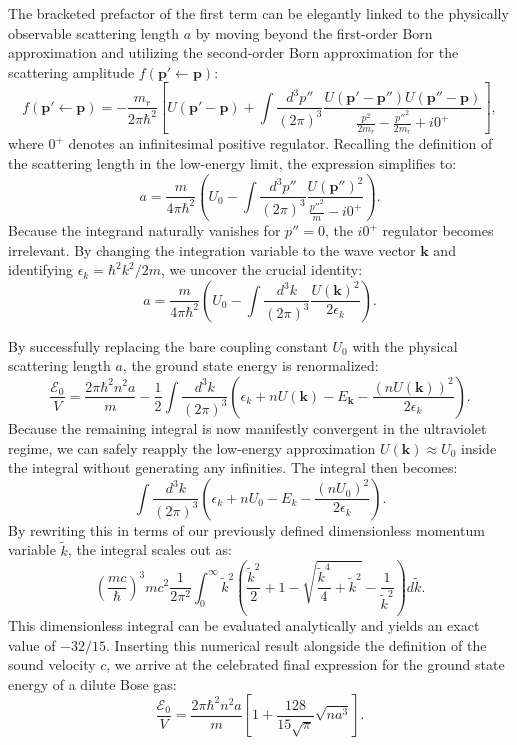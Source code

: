 The bracketed prefactor of the first term can be elegantly linked to the physically observable scattering length \( a \) by moving beyond the first-order Born approximation and utilizing the second-order Born approximation for the scattering amplitude \( f(\mathbf{p}' \leftarrow \mathbf{p}) \):
\[
    f(\mathbf{p}' \leftarrow \mathbf{p}) = -\frac{m_r}{2\pi\hbar^2} \left[ U(\mathbf{p}' - \mathbf{p}) + \int \frac{d^3p''}{(2\pi)^3} \frac{U(\mathbf{p}' - \mathbf{p}'')U(\mathbf{p}'' - \mathbf{p})}{\frac{p^2}{2m_r} - \frac{p''^2}{2m_r} + i0^+} \right],
\]
where \( 0^+ \) denotes an infinitesimal positive regulator. Recalling the definition of the scattering length in the low-energy limit, the expression simplifies to:
\[
    a = \frac{m}{4\pi\hbar^2} \left( U_0 - \int \frac{d^3p''}{(2\pi)^3} \frac{U(\mathbf{p}'')^2}{\frac{p''^2}{m} - i0^+} \right).
\]
Because the integrand naturally vanishes for \( p'' = 0 \), the \( i0^+ \) regulator becomes irrelevant. By changing the integration variable to the wave vector \( \mathbf{k} \) and identifying \( \epsilon_k = \hbar^2 k^2 / 2m \), we uncover the crucial identity:
\[
    a = \frac{m}{4\pi\hbar^2} \left( U_0 - \int \frac{d^3k}{(2\pi)^3} \frac{U(\mathbf{k})^2}{2\epsilon_k} \right).
\]

By successfully replacing the bare coupling constant \( U_0 \) with the physical scattering length \( a \), the ground state energy is renormalized:
\[
    \frac{\mathcal{E}_0}{V} = \frac{2\pi\hbar^2 n^2 a}{m} - \frac{1}{2} \int \frac{d^3k}{(2\pi)^3} \left( \epsilon_k + nU(\mathbf{k}) - E_{\mathbf{k}} - \frac{(nU(\mathbf{k}))^2}{2\epsilon_k} \right).
\]
Because the remaining integral is now manifestly convergent in the ultraviolet regime, we can safely reapply the low-energy approximation \( U(\mathbf{k}) \approx U_0 \) inside the integral without generating any infinities. The integral then becomes:
\[
    \int \frac{d^3k}{(2\pi)^3} \left( \epsilon_k + nU_0 - E_k - \frac{(nU_0)^2}{2\epsilon_k} \right).
\]
By rewriting this in terms of our previously defined dimensionless momentum variable \( \tilde{k} \), the integral scales out as:
\[
    \left(\frac{mc}{\hbar}\right)^3 mc^2 \frac{1}{2\pi^2} \int_0^\infty \tilde{k}^2 \left( \frac{\tilde{k}^2}{2} + 1 - \sqrt{\frac{\tilde{k}^4}{4} + \tilde{k}^2} - \frac{1}{\tilde{k}^2} \right) d\tilde{k}.
\]
This dimensionless integral can be evaluated analytically and yields an exact value of \( -32/15 \). Inserting this numerical result alongside the definition of the sound velocity \( c \), we arrive at the celebrated final expression for the ground state energy of a dilute Bose gas:
\begin{equation} \label{eq:lhy_energy}
    \frac{\mathcal{E}_0}{V} = \frac{2\pi\hbar^2 n^2 a}{m} \left[ 1 + \frac{128}{15\sqrt{\pi}} \sqrt{n a^3} \right].
\end{equation}

